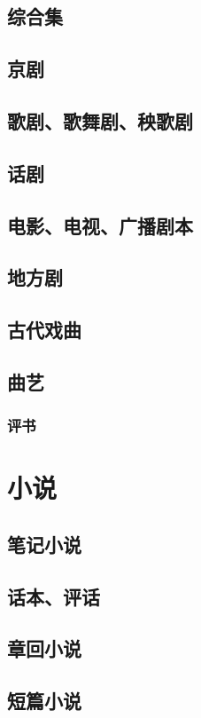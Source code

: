 \documentclass[UTF8]{../../RepresentationUniverse}
\begin{document}
    \subsection{综合集}
    \subsection{京剧}
    \subsection{歌剧、歌舞剧、秧歌剧}
    \subsection{话剧}
    \subsection{电影、电视、广播剧本}
    \subsection{地方剧}
    \subsection{古代戏曲}
    \subsection{曲艺}
        \subsubsection{评书}

\section{小说}
    \subsection{笔记小说}
    \subsection{话本、评话}
    \subsection{章回小说}
    \subsection{短篇小说}
\end{document}
